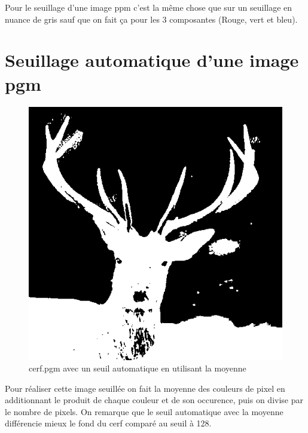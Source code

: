 \documentclass{article}
\begin{document}
Pour le seuillage d'une image ppm c'est la même chose que sur un seuillage en nuance de gris sauf que on fait ça pour les 3 composantes (Rouge, vert et bleu).

\newpage
\section{Seuillage automatique d'une image pgm}

\begin{figure}[h]
\centerline{\includegraphics[scale=0.6]{./rendus/cerfSeuilauto.png}}
\caption{cerf.pgm avec un seuil automatique en utilisant la moyenne}
\end{figure}

Pour réaliser cette image seuillée on fait la moyenne des couleurs de pixel en additionnant le produit de chaque couleur et de son occurence, puis on divise par le nombre de pixels.
On remarque que le seuil automatique avec la moyenne différencie mieux le fond du cerf comparé au seuil à 128.
\end{document}
